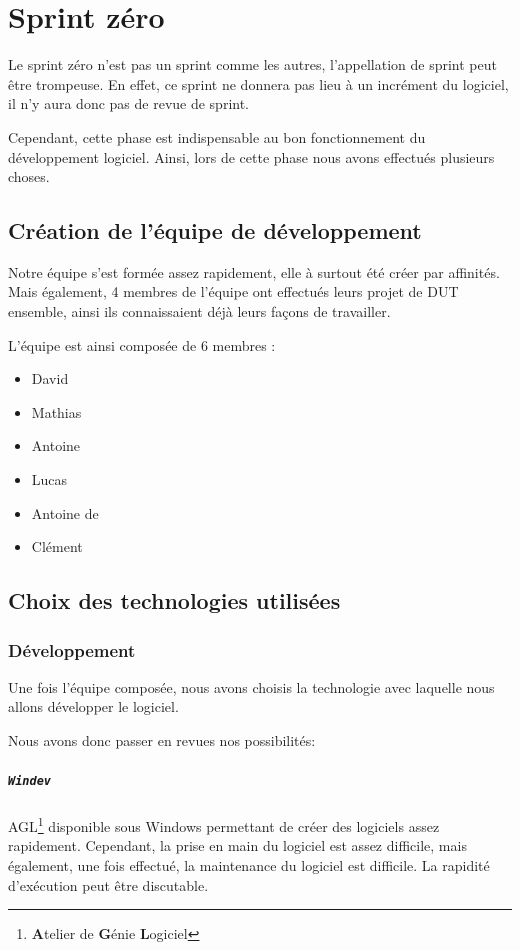 \chapter{Sprint zéro}\label{sprintzero}
Le sprint zéro n'est pas un sprint comme les autres, l'appellation de sprint peut être trompeuse. 
En effet, ce sprint ne donnera pas lieu à un incrément du logiciel, il n'y aura donc pas de revue de sprint. 

Cependant, cette phase est indispensable au bon fonctionnement du développement logiciel. 
Ainsi, lors de cette phase nous avons effectués plusieurs choses.

\section{Création de l'équipe de développement}
Notre équipe s'est formée assez rapidement, elle à surtout été créer par affinités. Mais également, 4 membres
de l'équipe ont effectués leurs projet de DUT ensemble, ainsi ils connaissaient déjà leurs façons de travailler.

L'équipe est ainsi composée de 6 membres : 
\begin{itemize}
	\item David 
	\item Mathias 
	\item Antoine 
	\item Lucas 
	\item Antoine de 
	\item Clément 
\end{itemize}

\section{Choix des technologies utilisées}\label{choixTechno}
	\subsection{Développement}
		Une fois l'équipe composée, nous avons choisis la technologie avec laquelle nous allons développer le logiciel.
	 
		Nous avons donc passer en revues nos possibilités: 
		\paragraph{\texttt{Windev}} AGL\footnote{\textbf{A}telier de \textbf{G}énie \textbf{L}ogiciel} disponible sous Windows permettant de créer des logiciels
		assez rapidement. Cependant, la prise en main du logiciel est assez difficile, mais également, une fois effectué, la maintenance du logiciel
		est difficile. La rapidité d'exécution peut être discutable. 

